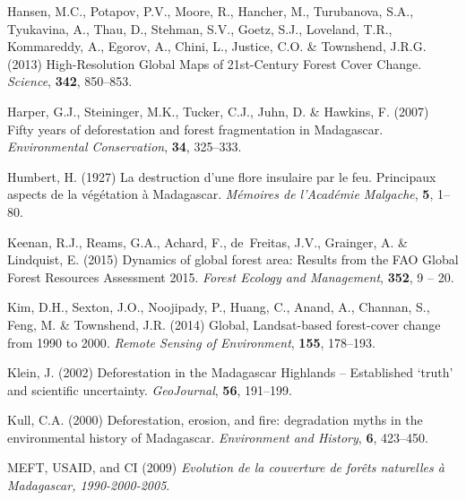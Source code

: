 \documentclass[a4paper, 12pt, leqno]{article} %
\begin{document}
\begin{thebibliography}{55}
Hansen, M.C., Potapov, P.V., Moore, R., Hancher, M., Turubanova, S.A.,
  Tyukavina, A., Thau, D., Stehman, S.V., Goetz, S.J., Loveland, T.R.,
  Kommareddy, A., Egorov, A., Chini, L., Justice, C.O. \& Townshend, J.R.G.
  (2013) {High-Resolution Global Maps of 21st-Century Forest Cover Change}.
\newblock \emph{Science}, \textbf{342}, 850--853.

Harper, G.J., Steininger, M.K., Tucker, C.J., Juhn, D. \& Hawkins, F. (2007)
  {Fifty years of deforestation and forest fragmentation in Madagascar}.
\newblock \emph{Environmental Conservation}, \textbf{34}, 325--333.

Humbert, H. (1927) {La destruction d'une flore insulaire par le feu. Principaux
  aspects de la végétation à Madagascar}.
\newblock \emph{Mémoires de l'Académie Malgache}, \textbf{5}, 1--80.

Keenan, R.J., Reams, G.A., Achard, F., de~Freitas, J.V., Grainger, A. \&
  Lindquist, E. (2015) {Dynamics of global forest area: Results from the FAO
  Global Forest Resources Assessment 2015}.
\newblock \emph{Forest Ecology and Management}, \textbf{352}, 9 -- 20.

Kim, D.H., Sexton, J.O., Noojipady, P., Huang, C., Anand, A., Channan, S.,
  Feng, M. \& Townshend, J.R. (2014) {Global, Landsat-based forest-cover change
  from 1990 to 2000}.
\newblock \emph{Remote Sensing of Environment}, \textbf{155}, 178--193.

Klein, J. (2002) {Deforestation in the Madagascar Highlands -- Established
  `truth' and scientific uncertainty}.
\newblock \emph{GeoJournal}, \textbf{56}, 191--199.

Kull, C.A. (2000) {Deforestation, erosion, and fire: degradation myths in the
  environmental history of Madagascar}.
\newblock \emph{Environment and History}, \textbf{6}, 423--450.

{MEFT, USAID, and CI} (2009) \emph{{Evolution de la couverture de forêts
  naturelles à Madagascar, 1990-2000-2005}}.


\end{thebibliography}
\end{document}
